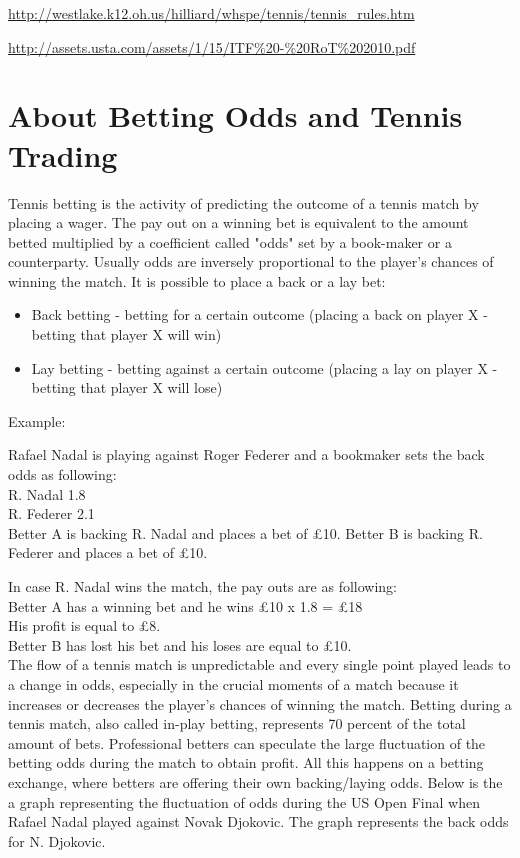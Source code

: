 \documentclass[10pt]{report}
\begin{document}
\url{http://westlake.k12.oh.us/hilliard/whspe/tennis/tennis_rules.htm}

\url{http://assets.usta.com/assets/1/15/ITF%20-%20RoT%202010.pdf}


\chapter{About Betting Odds and Tennis Trading}

Tennis betting is the activity of predicting the outcome of a tennis match by placing a wager.
The pay out on a winning bet is equivalent to the amount betted multiplied by a coefficient called "odds" set by a book-maker or a counterparty.
Usually odds are inversely proportional to the player's chances of winning the match.
It is possible to place a back or a lay bet:
\begin{itemize}
\item Back betting - betting for a certain outcome (placing a back on player X -
betting that player X will win)
\item Lay betting - betting against a certain outcome (placing a lay on player X -
betting that player X will lose)
\end{itemize}

Example: 

Rafael Nadal is playing against Roger Federer and a bookmaker sets the back odds as following:\\
R. Nadal               1.8\\
R. Federer             2.1\\

Better A is backing R. Nadal and places a bet of \pounds10. 
Better B is backing R. Federer and places a bet of \pounds 10.

In case R. Nadal wins the match, the pay outs are as following:\\
Better A has a winning bet and he wins \pounds10 x 1.8 = \pounds18\\
His profit is equal to \pounds8.\\
Better B has lost his bet and his loses are equal to \pounds10. \\

The flow of a tennis match is unpredictable and every single point played leads to a change in odds, 
especially in the crucial moments of a match because it increases or decreases the player's chances of winning the match. 
Betting during a tennis match, also called in-play betting, represents 70 percent of the total amount of bets. Professional betters can 
speculate the large fluctuation of the betting odds during the match to obtain profit. All this happens on a betting exchange, where 
betters are offering their own backing/laying odds. 
Below is the a graph representing the fluctuation of odds during the US Open Final when Rafael Nadal played against Novak Djokovic. 
The graph represents the back odds for N. Djokovic. 
\end{document}
